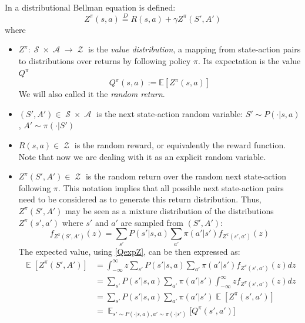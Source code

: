 \documentclass[12pt,a4paper,openright,twoside]{article}
\DeclareMathOperator*{\E}{\mathbb{E}}
\DeclareMathOperator*{\Sspace}{\mathcal{S}}
\DeclareMathOperator*{\A}{\mathcal{A}}
\DeclareMathOperator*{\Z}{\mathcal{Z}}
\numberwithin{equation}{section}
\theoremstyle{definition}
\theoremstyle{remark}
\theoremstyle{plain}
\begin{document}
In \cite{DRL} a distributional Bellman equation is defined:
\begin{equation} \label{distBE}
    Z^{\pi}(s,a) \stackrel{D}{=} R(s,a) + \gamma Z^{\pi}(S',A')
\end{equation}
where
\begin{itemize}
    \item $Z^\pi: \Sspace \times \A \rightarrow \Z$ is the \textit{value distribution}, a mapping from state-action pairs to distributions over returns by following policy $\pi$. Its expectation is the value $Q^\pi$
    	\begin{equation} \label{QexpZ}
        		Q^\pi(s,a) := \mathbb{E} [Z^\pi(s,a)]
    	\end{equation}
    	We will also called it the \textit{random return}.
    \item $(S',A') \in \Sspace \times \A$ is the next state-action random variable: $S'\sim P(\cdot | s,a)$, $A' \sim \pi(\cdot | S')$
    \item $R(s,a) \in \Z$ is the random reward, or equivalently the reward function. Note that now we are dealing with it as an explicit random variable.
    \item $Z^\pi(S',A') \in \Z$ is the random return over the random next state-action following $\pi$. This notation implies that all possible next state-action pairs need to be considered as to generate this return distribution. Thus, $Z^\pi(S',A')$ may be seen as a mixture distribution of the distributions $Z^\pi(s',a')$ where $s'$ and $a'$ are sampled from $(S',A')$:
    \begin{equation}
        f_{Z^\pi(S',A')} (z) = \sum_{s'} P(s' | s,a) \sum_{a'} \pi(a'|s') f_{Z^\pi(s',a')}(z)
    \end{equation}
    The expected value, using \ref{QexpZ}, can be then expressed as:
    \begin{equation} \label{expNextRandomReturn}
    \begin{split}
        \E[Z^\pi(S',A')] &=  \int_{-\infty}^{\infty} z \sum_{s'} P(s' | s,a) \sum_{a'} \pi(a'|s') f_{Z^\pi(s',a')}(z) dz \\
        &=  \sum_{s'} P(s' | s,a) \sum_{a'} \pi(a'|s') \int_{-\infty}^{\infty} z f_{Z^\pi(s',a')}(z) dz \\
        &=  \sum_{s'} P(s' | s,a) \sum_{a'} \pi(a'|s') \E[Z^\pi(s',a')] \\
        &= \E_{s'\sim P(\cdot | s,a), a' \sim \pi(\cdot | s')} \bigg[Q^\pi(s',a') \bigg] 
    \end{split}
    \end{equation}
\end{itemize}
\end{document}
